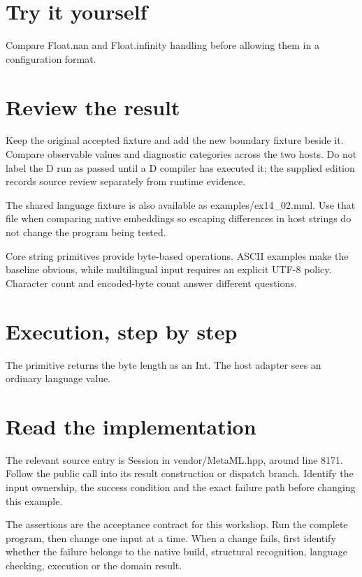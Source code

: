 \section*{Try it yourself}
Compare Float.nan and Float.infinity handling before allowing them in a configuration format.

\section*{Review the result}
Keep the original accepted fixture and add the new boundary fixture beside it. Compare observable values and diagnostic categories across the two hosts. Do not label the D run as passed until a D compiler has executed it; the supplied edition records source review separately from runtime evidence.

The shared language fixture is also available as examples/ex14\_02.mml. Use that file when comparing native embeddings so escaping differences in host strings do not change the program being tested.

\clearpage
{}
Core string primitives provide byte-based operations. ASCII examples make the baseline obvious, while multilingual input requires an explicit UTF-8 policy. Character count and encoded-byte count answer different questions.


\section*{Execution, step by step}
The primitive returns the byte length as an Int. The host adapter sees an ordinary language value.

\section*{Read the implementation}
The relevant source entry is Session in vendor/MetaML.hpp, around line 8171. Follow the public call into its result construction or dispatch branch. Identify the input ownership, the success condition and the exact failure path before changing this example.

The assertions are the acceptance contract for this workshop. Run the complete program, then change one input at a time. When a change fails, first identify whether the failure belongs to the native build, structural recognition, language checking, execution or the domain result.

